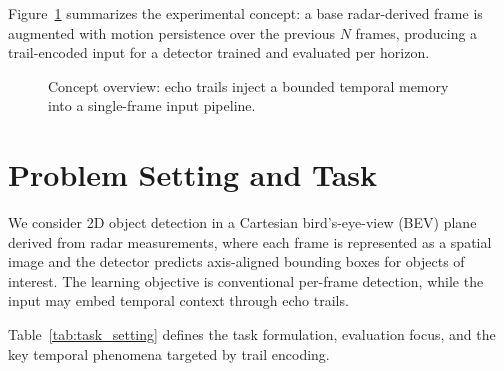 \documentclass[twocolumn, 10pt]{article}
\begin{document}
Figure~\ref{fig:concept_overview} summarizes the experimental concept: a base radar-derived frame is augmented with motion persistence over the previous $N$ frames, producing a trail-encoded input for a detector trained and evaluated per horizon.

\begin{figure}[t]
\centering
{}
\caption{Concept overview: echo trails inject a bounded temporal memory into a single-frame input pipeline.}
\label{fig:concept_overview}
\end{figure}

\section{Problem Setting and Task}
We consider 2D object detection in a Cartesian bird's-eye-view (BEV) plane derived from radar measurements, where each frame is represented as a spatial image and the detector predicts axis-aligned bounding boxes for objects of interest. The learning objective is conventional per-frame detection, while the input may embed temporal context through echo trails.

Table~\ref{tab:task_setting} defines the task formulation, evaluation focus, and the key temporal phenomena targeted by trail encoding.
\end{document}
